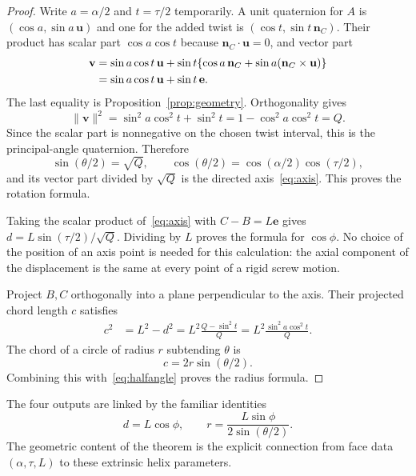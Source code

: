 \documentclass[11pt]{article}
\theoremstyle{definition}
\newcommand{\nc}{\mathbf n_C}
\newcommand{\ee}{\mathbf e}
\newcommand{\uu}{\mathbf u}
\begin{document}
\begin{proof}
Write $a=\alpha/2$ and $t=\tau/2$ temporarily. A unit quaternion for $A$ is
$(\cos a,\sin a\,\uu)$ and one for the added twist is
$(\cos t,\sin t\,\nc)$. Their product has scalar part
$\cos a\cos t$ because $\nc\cdot\uu=0$, and vector part
\begin{align}
 \mathbf v&=\sin a\cos t\,\uu+
       \sin t\{\cos a\,\nc+\sin a(\nc\times\uu)\}\notag\\
           &=\sin a\cos t\,\uu+\sin t\,\ee.\label{eq:qvector}
\end{align}
The last equality is Proposition~\ref{prop:geometry}. Orthogonality gives
\[
 \|\mathbf v\|^2=\sin^2a\cos^2t+\sin^2t
                 =1-\cos^2a\cos^2t=Q.
\]
Since the scalar part is nonnegative on the chosen twist interval, this is
the principal-angle quaternion. Therefore
\begin{equation}\label{eq:halfangle}
 \sin(\theta/2)=\sqrt Q,
 \qquad \cos(\theta/2)=\cos(\alpha/2)\cos(\tau/2),
\end{equation}
and its vector part divided by $\sqrt Q$ is the directed axis~\eqref{eq:axis}.
This proves the rotation formula.

Taking the scalar product of~\eqref{eq:axis} with $C-B=L\ee$ gives
$d=L\sin(\tau/2)/\sqrt Q$. Dividing by $L$ proves the formula for
$\cos\phi$. No choice of the position of an axis point is needed for this
calculation: the axial component of the displacement is the same at every
point of a rigid screw motion.

Project $B,C$ orthogonally into a plane perpendicular to the axis. Their
projected chord length $c$ satisfies
\begin{align}
 c^2&=L^2-d^2
     =L^2\frac{Q-\sin^2t}{Q}
     =L^2\frac{\sin^2a\cos^2t}{Q}.
\end{align}
The chord of a circle of radius $r$ subtending $\theta$ is
\begin{equation}\label{eq:chord}
 c=2r\sin(\theta/2).
\end{equation}
Combining this with~\eqref{eq:halfangle} proves the radius formula.
\end{proof}

The four outputs are linked by the familiar identities
\begin{equation}\label{eq:linked}
 d=L\cos\phi,\qquad
 r=\frac{L\sin\phi}{2\sin(\theta/2)}.
\end{equation}
The geometric content of the theorem is the explicit connection from face
data $(\alpha,\tau,L)$ to these extrinsic helix parameters.
\end{document}
